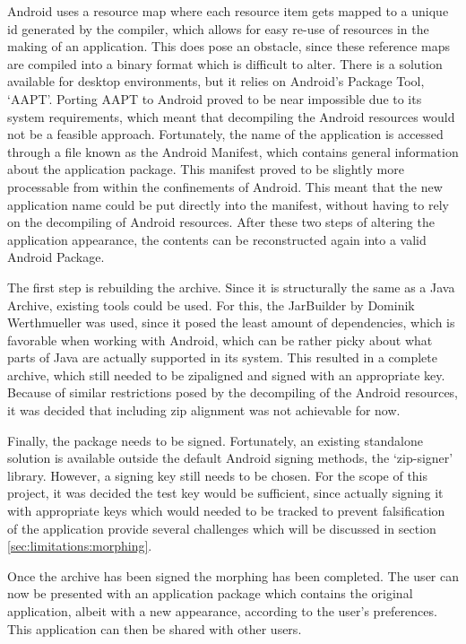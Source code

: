 Android uses a resource map where each resource item gets mapped to a unique id generated by the compiler, which allows for easy re-use of resources in the making of an application.
This does pose an obstacle, since these reference maps are compiled into a binary format which is difficult to alter.
There is a solution available for desktop environments\cite{website:apktool}, but it relies on Android's Package Tool, `AAPT'.
Porting AAPT to Android proved to be near impossible due to its system requirements, which meant that decompiling the Android resources would not be a feasible approach.
Fortunately, the name of the application is accessed through a file known as the Android Manifest, which contains general information about the application package.
This manifest proved to be slightly more processable from within the confinements of Android.
This meant that the new application name could be put directly into the manifest, without having to rely on the decompiling of Android resources.
After these two steps of altering the application appearance, the contents can be reconstructed again into a valid Android Package.

The first step is rebuilding the archive. 
Since it is structurally the same as a Java Archive, existing tools could be used. 
For this, the JarBuilder by Dominik Werthmueller\cite{website:jarbuilder} was used, since it posed the least amount of dependencies, which is favorable when working with Android, which can be rather picky about what parts of Java are actually supported in its system.
This resulted in a complete archive, which still needed to be zipaligned and signed with an appropriate key.
Because of similar restrictions posed by the decompiling of the Android resources, it was decided that including zip alignment was not achievable for now.

Finally, the package needs to be signed. 
Fortunately, an existing standalone solution is available outside the default Android signing methods, the `zip-signer' library\cite{website:zip-signer}.
However, a signing key still needs to be chosen. 
For the scope of this project, it was decided the test key would be sufficient, since actually signing it with appropriate keys which would needed to be tracked to prevent falsification of the application provide several challenges which will be discussed in section \ref{sec:limitations:morphing}.

Once the archive has been signed the morphing has been completed. 
The user can now be presented with an application package which contains the original application, albeit with a new appearance, according to the user's preferences.
This application can then be shared with other users.


